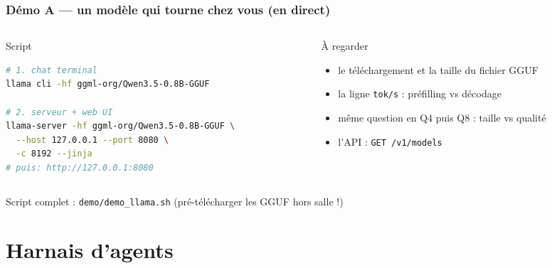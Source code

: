 \documentclass[
	11pt,
	aspectratio=169
]{beamer}
\begin{document}
\begin{frame}[fragile]
    \frametitle{\normalsize\bfseries Démo A --- un modèle qui tourne chez vous (en direct)}
    \begin{columns}[t]
        \begin{column}{0.5\textwidth}
            \begin{block}{\footnotesize Script}
\begin{lstlisting}[language=bash, basicstyle=\ttfamily\scriptsize]
# 1. chat terminal
llama cli -hf ggml-org/Qwen3.5-0.8B-GGUF

# 2. serveur + web UI
llama-server -hf ggml-org/Qwen3.5-0.8B-GGUF \
  --host 127.0.0.1 --port 8080 \
  -c 8192 --jinja
# puis: http://127.0.0.1:8080
\end{lstlisting}
            \end{block}
        \end{column}
        \begin{column}{0.46\textwidth}
            \begin{exampleblock}{\footnotesize À regarder}
                \begin{itemize}\setlength\itemsep{0.3em}
                    \item le téléchargement et la taille du fichier GGUF
                    \item la ligne \texttt{tok/s} : préfilling vs décodage
                    \item même question en Q4 puis Q8 : taille vs qualité
                    \item l'API : \texttt{GET /v1/models}
                \end{itemize}
            \end{exampleblock}
        \end{column}
    \end{columns}
    \vfill
    \small Script complet : \texttt{demo/demo\_llama.sh} (pré-télécharger les GGUF hors salle !)
\end{frame}

\section{Harnais d'agents}
\end{document}
